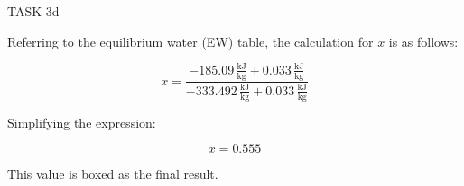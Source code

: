 TASK 3d

Referring to the equilibrium water (EW) table, the calculation for \( x \) is as follows:

\[
x = \frac{-185.09 \, \frac{\text{kJ}}{\text{kg}} + 0.033 \, \frac{\text{kJ}}{\text{kg}}}{-333.492 \, \frac{\text{kJ}}{\text{kg}} + 0.033 \, \frac{\text{kJ}}{\text{kg}}}
\]

Simplifying the expression:

\[
x = 0.555
\]

This value is boxed as the final result.